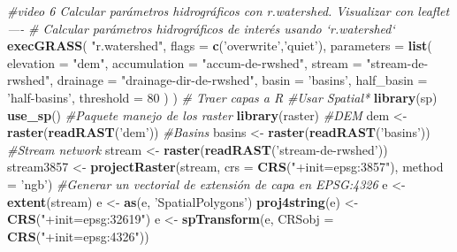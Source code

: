 \documentclass[11pt,]{article}
\newenvironment{Shaded}{\begin{snugshade}}{\end{snugshade}}
\newcommand{\KeywordTok}[1]{\textcolor[rgb]{0.13,0.29,0.53}{\textbf{#1}}}
\newcommand{\DataTypeTok}[1]{\textcolor[rgb]{0.13,0.29,0.53}{#1}}
\newcommand{\DecValTok}[1]{\textcolor[rgb]{0.00,0.00,0.81}{#1}}
\newcommand{\StringTok}[1]{\textcolor[rgb]{0.31,0.60,0.02}{#1}}
\newcommand{\CommentTok}[1]{\textcolor[rgb]{0.56,0.35,0.01}{\textit{#1}}}
\newcommand{\NormalTok}[1]{#1}
\begin{document}
\begin{Shaded}
\begin{Highlighting}[]
\CommentTok{#video 6 Calcular parámetros hidrográficos con r.watershed. Visualizar con leaflet ----}
\CommentTok{# Calcular parámetros hidrográficos de interés usando `r.watershed`}
\KeywordTok{execGRASS}\NormalTok{(}
  \StringTok{"r.watershed"}\NormalTok{,}
  \DataTypeTok{flags =} \KeywordTok{c}\NormalTok{(}\StringTok{'overwrite'}\NormalTok{,}\StringTok{'quiet'}\NormalTok{),}
  \DataTypeTok{parameters =} \KeywordTok{list}\NormalTok{(}
    \DataTypeTok{elevation =} \StringTok{"dem"}\NormalTok{,}
    \DataTypeTok{accumulation =} \StringTok{"accum-de-rwshed"}\NormalTok{,}
    \DataTypeTok{stream =} \StringTok{"stream-de-rwshed"}\NormalTok{,}
    \DataTypeTok{drainage =} \StringTok{"drainage-dir-de-rwshed"}\NormalTok{,}
    \DataTypeTok{basin =} \StringTok{'basins'}\NormalTok{,}
    \DataTypeTok{half_basin =} \StringTok{'half-basins'}\NormalTok{,}
    \DataTypeTok{threshold =} \DecValTok{80}
\NormalTok{  )}
\NormalTok{)}
\CommentTok{# Traer capas a R}
\CommentTok{#Usar Spatial*}
\KeywordTok{library}\NormalTok{(sp)}
\KeywordTok{use_sp}\NormalTok{()}
\CommentTok{#Paquete manejo de los raster}
\KeywordTok{library}\NormalTok{(raster)}
\CommentTok{#DEM}
\NormalTok{dem <-}\StringTok{ }\KeywordTok{raster}\NormalTok{(}\KeywordTok{readRAST}\NormalTok{(}\StringTok{'dem'}\NormalTok{))}
\CommentTok{#Basins}
\NormalTok{basins <-}\StringTok{ }\KeywordTok{raster}\NormalTok{(}\KeywordTok{readRAST}\NormalTok{(}\StringTok{'basins'}\NormalTok{))}
\CommentTok{#Stream network}
\NormalTok{stream <-}\StringTok{ }\KeywordTok{raster}\NormalTok{(}\KeywordTok{readRAST}\NormalTok{(}\StringTok{'stream-de-rwshed'}\NormalTok{))}
\NormalTok{stream3857 <-}\StringTok{ }\KeywordTok{projectRaster}\NormalTok{(stream, }\DataTypeTok{crs =} \KeywordTok{CRS}\NormalTok{(}\StringTok{"+init=epsg:3857"}\NormalTok{), }\DataTypeTok{method =} \StringTok{'ngb'}\NormalTok{)}
\CommentTok{#Generar un vectorial de extensión de capa en EPSG:4326}
\NormalTok{e <-}\StringTok{ }\KeywordTok{extent}\NormalTok{(stream)}
\NormalTok{e <-}\StringTok{ }\KeywordTok{as}\NormalTok{(e, }\StringTok{'SpatialPolygons'}\NormalTok{)}
\KeywordTok{proj4string}\NormalTok{(e) <-}\StringTok{ }\KeywordTok{CRS}\NormalTok{(}\StringTok{"+init=epsg:32619"}\NormalTok{)}
\NormalTok{e <-}\StringTok{ }\KeywordTok{spTransform}\NormalTok{(e, }\DataTypeTok{CRSobj =} \KeywordTok{CRS}\NormalTok{(}\StringTok{"+init=epsg:4326"}\NormalTok{))}


\end{Highlighting}
\end{Shaded}
\end{document}
